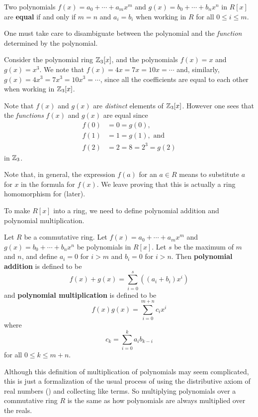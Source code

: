 \begin{definition}
    Two polynomials $f(x) = a_0 + \cdots + a_mx^m$ and $g(x) = b_0 + \cdots + b_nx^n$ in $R[x]$ are \textbf{equal} if and only if $m = n$ and $a_i = b_i$ when working in $R$ for all $0 \leq i \leq m$.
\end{definition}

One must take care to disambiguate between the polynomial and the \textit{function} determined by the polynomial.
\begin{example}
    Consider the polynomial ring $\mathbb{Z}_3[x]$, and the polynomials $f(x) = x$ and $g(x) = x^3$. We note that $f(x) = 4x = 7x = 10x = \cdots$ and, similarly, $g(x) = 4x^3 = 7x^3 = 10x^3 = \cdots$, since all the coefficients are equal to each other when working in $\mathbb{Z}_3[x]$.
    
    Note that $f(x)$ and $g(x)$ are \textit{distinct} elements of $\mathbb{Z}_3[x]$. However one sees that the \textit{functions} $f(x)$ and $g(x)$ are equal since
    \begin{align*}
        f(0) &= 0 = g(0),\\
        f(1) &= 1 = g(1), \text{ and }\\
        f(2) &= 2 = 8 = 2^3 = g(2)
    \end{align*}
    in $\mathbb{Z}_3$.
\end{example}

Note that, in general, the expression $f(a)$ for an $a \in R$ means to substitute $a$ for $x$ in the formula for $f(x)$. We leave proving that this is actually a ring homomorphism for  (later).

To make $R[x]$ into a ring, we need to define polynomial addition and polynomial multiplication.
\begin{definition}
    Let $R$ be a commutative ring. Let $f(x) = a_0 + \cdots + a_mx^m$ and $g(x) = b_0 + \cdots + b_nx^n$ be polynomials in $R[x]$. Let $s$ be the maximum of $m$ and $n$, and define $a_i = 0$ for $i > m$ and $b_i = 0$ for $i > n$. Then \textbf{polynomial addition} is defined to be
    \[
        f(x)+g(x) = \sum_{i=0}^s\left((a_i+b_i)x^i\right)
    \]
    and \textbf{polynomial multiplication} is defined to be
    \[
        f(x)g(x) = \sum_{i=0}^{m+n}c_ix^i
    \]
    where
    \[
        c_k = \sum_{i=0}^k a_ib_{k-i}
    \]
    for all $0 \leq k \leq m + n$.
\end{definition}
Although this definition of multiplication of polynomials may seem complicated, this is just a formalization of the usual process of using the distributive axiom of real numbers () and collecting like terms. So multiplying polynomials over a commutative ring $R$ is the same as how polynomials are always multiplied over the reals.

